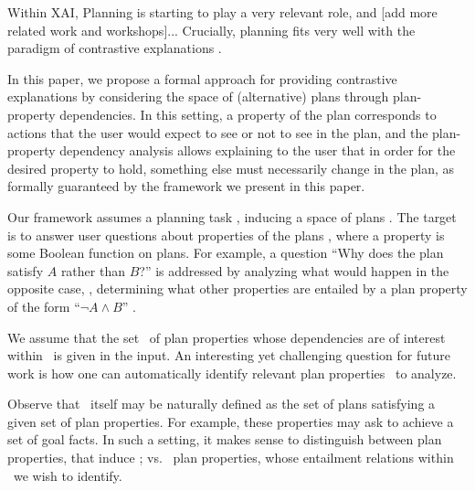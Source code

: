 %
Within XAI, Planning is starting to play a very relevant role, and
[add more related work and workshops]...  Crucially, planning fits
very well with the paradigm of contrastive explanations
\cite{xaip_magazzeni, contrastive_miller}.

%
In this paper, we propose a formal approach for providing contrastive
explanations by considering the space of (alternative) plans through
plan-property dependencies. In this setting, a property of the plan
corresponds to actions that the user would expect to see or not to see
in the plan, and the plan-property dependency analysis allows
explaining to the user that in order for the desired property to hold,
something else must necessarily change in the plan, as formally
guaranteed by the framework we present in this paper.



%
Our framework assumes a planning task \task, inducing a space of plans
\plans. The target is to answer user questions about properties of the
plans \plans, where a property is some Boolean function on plans. For
example, a question ``Why does the plan satisfy $A$ rather than $B$?''
is addressed by analyzing what would happen in the opposite case, \ie,
determining what other properties are entailed by a plan property of
the form ``$\neg A \wedge B$'' . 

%
We assume that the set \props\ of plan properties whose dependencies
are of interest within \plans\ is given in the input. An interesting
yet challenging question for future work is how one can automatically
identify relevant plan properties \props\ to analyze.

Observe that \plans\ itself may be naturally defined as the set of
plans satisfying a given set of plan properties. For example, these
properties may ask to achieve a set of goal facts. In such a setting,
it makes sense to distinguish between  plan
properties, that induce \plans; vs.\  plan
properties, whose entailment relations within \plans\ we wish to
identify. 

